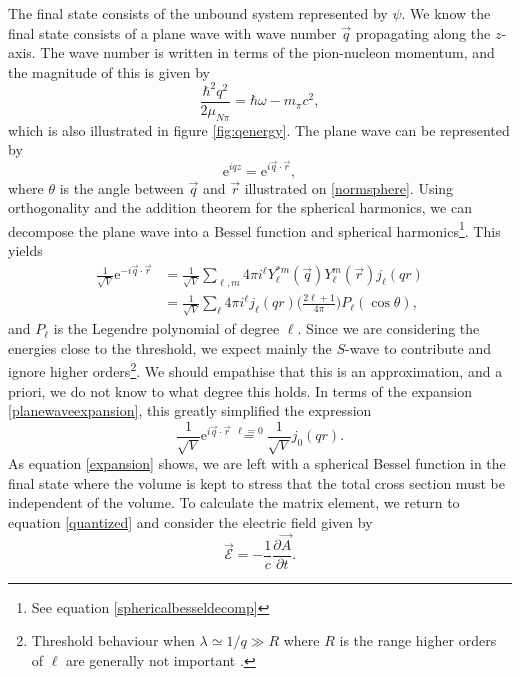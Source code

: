 The final state consists of the unbound system represented by $\psi$. We know the final state consists of a plane wave with wave number $\vec{q}$ propagating along the $z$-axis. The wave number  is written in terms of the pion-nucleon momentum, and the magnitude of this is given by
\begin{equation}\label{key}
	\frac{\hbar^2 q^2}{2\mu_{N\pi}}=\hbar \omega-m_\pi c^2,
\end{equation}
which is also illustrated in figure \ref{fig:qenergy}. The plane wave can be represented by 
\begin{equation} \label{key}
	\text{e}^{iqz} = \text{e}^{i \vec{q}\cdot \vec{r}},
\end{equation}
where $\theta$ is the angle between $\vec{q}$ and $\vec{r}$ illustrated on \ref{normsphere}. Using orthogonality and the addition theorem for the spherical harmonics, we can decompose the plane wave into a Bessel function and spherical harmonics\footnote{See equation \eqref{sphericalbesseldecomp}}. This yields
\begin{align}\label{planewaveexpansion}
	\frac{1}{\sqrt{V}} \text{e}^{-i\vec{q}\cdot\vec{r}} &= \frac{1}{\sqrt{V}} \sum_{\ell,m} 4\pi i^\ell Y_\ell^{*m}(\vec{q})Y_\ell^m(\vec{r})j_\ell(qr) \\
	&= \frac{1}{\sqrt{V}} \sum_\ell 4\pi i^\ell j_\ell(qr) \bigg( \frac{2\ell+1}{4\pi}\bigg)P_\ell(\cos\theta),
\end{align}
and $P_\ell$ is the Legendre polynomial of degree $\ell$. Since we are considering the energies close to the threshold, we expect mainly the $S$-wave to contribute and ignore higher orders\footnote{Threshold behaviour when $\lambda\simeq1/q\gg R$ where $R$ is the range higher orders of $\ell$ are generally not important \cite{Sakurai}.}. We should empathise that this is an approximation, and a priori, we do not know to what degree this holds. In terms of the expansion \eqref{planewaveexpansion}, this greatly simplified the expression
\begin{equation} \label{expansion}
	\frac{1}{\sqrt{V}}\text{e}^{i\vec{q}\cdot \vec{r}} \stackrel{\ell=0}{=} \frac{1}{\sqrt{V}}j_0(qr).
\end{equation}
As equation \eqref{expansion} shows, we are left with a spherical Bessel function in the final state where the volume is kept to stress that the total cross section must be independent of the volume. To calculate the matrix element, we return to equation \eqref{quantized} and consider the electric field given by
\begin{equation}\label{EF}
	\vec{\mathcal{E}} = -\frac{1}{c} \frac{\partial \vec{A}}{\partial t}.
\end{equation}
